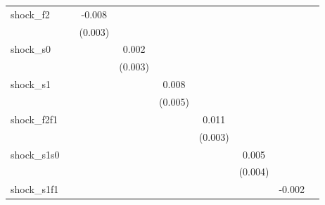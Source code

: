 {\begin{tabular}{l*{8}{c}}
\addlinespace
shock\_f2    &                     &      -0.008\sym{***}&                     &                     &                     &                     &                     &                     \\
            &                     &     (0.003)         &                     &                     &                     &                     &                     &                     \\
\addlinespace
shock\_s0    &                     &                     &       0.002         &                     &                     &                     &                     &                     \\
            &                     &                     &     (0.003)         &                     &                     &                     &                     &                     \\
\addlinespace
shock\_s1    &                     &                     &                     &       0.008         &                     &                     &                     &                     \\
            &                     &                     &                     &     (0.005)         &                     &                     &                     &                     \\
\addlinespace
shock\_f2f1  &                     &                     &                     &                     &       0.011\sym{***}&                     &                     &                     \\
            &                     &                     &                     &                     &     (0.003)         &                     &                     &                     \\
\addlinespace
shock\_s1s0  &                     &                     &                     &                     &                     &       0.005         &                     &                     \\
            &                     &                     &                     &                     &                     &     (0.004)         &                     &                     \\
\addlinespace
shock\_s1f1  &                     &                     &                     &                     &                     &                     &      -0.002         &                     \\

\end{tabular}}
